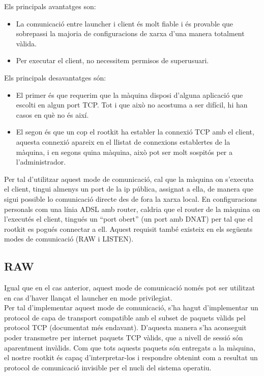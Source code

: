 Els principals avantatges son: \\

\begin{itemize}
    \item La comunicació entre launcher i client és molt fiable i és provable que sobrepassi la majoria de 
        configuracions de xarxa d'una manera totalment vàlida.
    \item Per executar el client, no necessitem permisos de superusuari.
\end{itemize}

Els principals desavantatges són: \\

\begin{itemize}
    \item El primer és que requerim que la màquina disposi d'alguna aplicació que escolti en algun port 
        TCP. Tot i que això no acostuma a ser difícil, hi han casos en què no és així.
    \item El segon és que un cop el rootkit ha establer la connexió TCP amb el client, aquesta connexió
        apareix en el llistat de connexions establertes de la màquina, i en segons quina màquina, això
        pot ser molt sospitós per a l'administrador.
\end{itemize}

Per tal d'utilitzar aquest mode de comunicació, cal que la màquina on s'executa el client, tingui almenys
un port de la ip pública, assignat a ella, de manera que sigui possible lo comunicació directe des de fora
la xarxa local. En configuracions personals com una línia ADSL amb router, caldria que el router de la màquina
on l'executés el client, tingués un ``port obert'' (un port amb DNAT) per tal que el rootkit es pogués 
connectar a ell. Aquest requisit també existeix en els següents modes de comunicació (RAW i LISTEN). \\

\subsection{RAW}

Igual que en el cas anterior, aquest mode de comunicació només pot ser utilitzat en cas d'haver llançat el launcher
en mode privilegiat. \\

Per tal d'implementar aquest mode de comunicació, s'ha hagut d'implementar un protocol de capa de transport 
compatible amb el subset de paquets vàlids pel protocol TCP (documentat més endavant). D'aquesta manera s'ha 
aconseguit poder transmetre per internet paquets TCP vàlids, que a nivell de sessió són aparentment invàlids. 
Com que tots aquests paquets són entregats a la màquina, el nostre rootkit és capaç d'interpretar-los i 
respondre obtenint com a resultat un protocol de comunicació invisible per el nucli del sistema operatiu. \\


